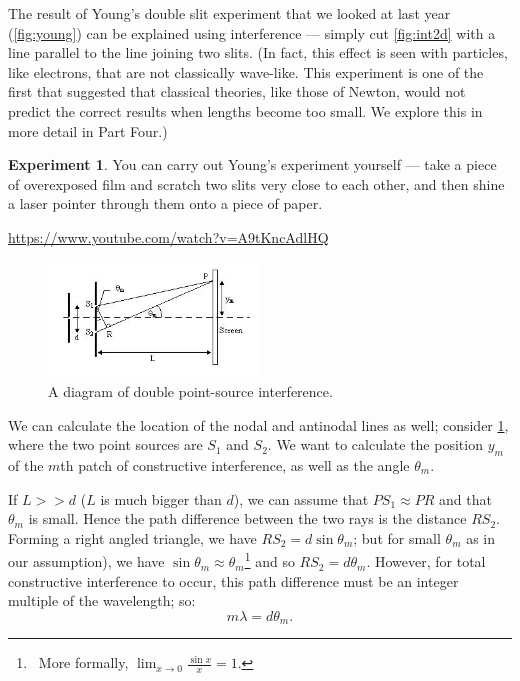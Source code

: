 \documentclass[a4paper]{amsbook}
\newcommand{\goandwatch}[1]{
\begin{center}
\begin{tcolorbox}[width=0.8\textwidth,colback={SkyBlue!20},title={\textbf{Go and watch...}},colbacktitle=MidnightBlue,coltitle=White]
  \textcolor{MidnightBlue}{\url{#1}}
\end{tcolorbox}
\end{center}}
\theoremstyle{definition}
\numberwithin{exercise}{chapter}
\numberwithin{exercise}{chapter}
\newtheorem{experiment}[exercise]{Experiment}
\begin{document}
The result of Young's double slit experiment that we looked at last year (\cref{fig:young}) can be explained using interference --- simply cut \cref{fig:int2d}
with a line parallel to the line joining two slits. (In fact, this effect is seen with particles, like electrons, that are not classically wave-like. This
experiment is one of the first that suggested that classical theories, like those of Newton, would not predict the correct results when lengths become
too small. We explore this in more detail in Part Four.)

\begin{experiment}
  You can carry out Young's experiment yourself --- take a piece of overexposed film and scratch two slits very close to each other, and then shine a laser
  pointer through them onto a piece of paper.
\end{experiment}

\goandwatch{https://www.youtube.com/watch?v=A9tKncAdlHQ}

\begin{figure}
  \centering
  \includegraphics[width=0.5\textwidth]{young3}
  \caption{A diagram of double point-source interference.}\label{fig:young3}
\end{figure}

We can calculate the location of the nodal and antinodal lines as well; consider \cref{fig:young3}, where the two point sources
are $ S_1 $ and $ S_2 $. We want to calculate the position $ y_m $ of the $ m$th patch of constructive interference, as well
as the angle $ \theta_m $.

If $ L >> d $ ($ L $ is much bigger than $ d $), we can assume that $ PS_1 \approx PR $ and that $ \theta_m $ is small. Hence the path difference between the
two rays is the distance $ RS_2 $. Forming a right angled triangle, we have $ RS_2 = d \sin \theta_m $; but for small $ \theta_m $ as in our assumption),
we have $ \sin \theta_m \approx \theta_m $\footnote{~More formally, $ \lim_{x \to 0} \frac{\sin x}{x} = 1 $.} and so $ RS_2 = d\theta_m $. However, for
total constructive interference to occur, this path difference must be an integer multiple of the wavelength; so:
\begin{equation}
  m \lambda = d \theta_m.
\end{equation}
\end{document}
